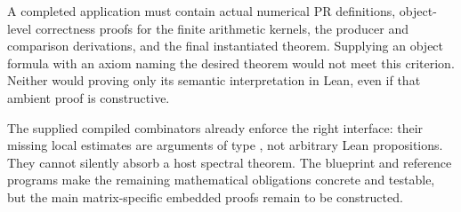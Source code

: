 A completed application must contain actual numerical PR definitions, object-level correctness proofs for the finite arithmetic kernels, the producer and comparison derivations, and the final instantiated theorem. Supplying an object formula with an axiom naming the desired theorem would not meet this criterion. Neither would proving only its semantic interpretation in Lean, even if that ambient proof is constructive.

The supplied compiled combinators already enforce the right interface: their missing local estimates are arguments of type , not arbitrary Lean propositions. They cannot silently absorb a host spectral theorem. The blueprint and reference programs make the remaining mathematical obligations concrete and testable, but the main matrix-specific embedded proofs remain to be constructed.
